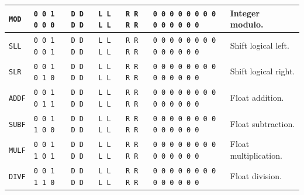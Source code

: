 \documentclass{report}
\begin{document}
{\begin{center}
\begin{tabular}[ht]{
	| p{} | p{} | p{} | p{}
	| p{} | p{} | p{} |
}
	\texttt{MOD} & \texttt{0 0 1 0 0 0} & \texttt{D D D D} & \texttt{L L L L} & \texttt{R R R R} &
		\texttt{0 0 0 0 0 0 0 0 0 0 0 0 0 0} & Integer modulo. \\
	\hline
	
	\texttt{SLL} & \texttt{0 0 1 0 0 1} & \texttt{D D D D} & \texttt{L L L L} & \texttt{R R R R} &
		\texttt{0 0 0 0 0 0 0 0 0 0 0 0 0 0} & Shift logical left. \\
	\hline
	
	\texttt{SLR} & \texttt{0 0 1 0 1 0} & \texttt{D D D D} & \texttt{L L L L} & \texttt{R R R R} &
		\texttt{0 0 0 0 0 0 0 0 0 0 0 0 0 0} & Shift logical right. \\
	\hline
	
	\texttt{ADDF} & \texttt{0 0 1 0 1 1} & \texttt{D D D D} & \texttt{L L L L} & \texttt{R R R R} &
		\texttt{0 0 0 0 0 0 0 0 0 0 0 0 0 0} & Float addition. \\
	\hline
	
	\texttt{SUBF} & \texttt{0 0 1 1 0 0} & \texttt{D D D D} & \texttt{L L L L} & \texttt{R R R R} &
		\texttt{0 0 0 0 0 0 0 0 0 0 0 0 0 0} & Float subtraction. \\
	\hline
	
	\texttt{MULF} & \texttt{0 0 1 1 0 1} & \texttt{D D D D} & \texttt{L L L L} & \texttt{R R R R} &
		\texttt{0 0 0 0 0 0 0 0 0 0 0 0 0 0} & Float multiplication. \\
	\hline
	
	\texttt{DIVF} & \texttt{0 0 1 1 1 0} & \texttt{D D D D} & \texttt{L L L L} & \texttt{R R R R} &
		\texttt{0 0 0 0 0 0 0 0 0 0 0 0 0 0} & Float division. \\
	\hline
\end{tabular}
\end{center}
}
\end{document}
